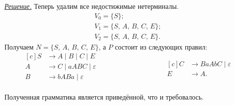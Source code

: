 \documentclass[10pt]{article}
\newcounter{pr} \setcounter{pr}{0}
\newenvironment{sol}
  {\par
   {\itshape \underline{Решение.}}}
  {}
\newcommand{\eps}{\varepsilon}
\begin{document}
\begin{pr}
\begin{sol}
      Теперь удалим все недостижимые нетерминалы.
      \begin{gather*}
        V_0 = \{ S \}; \\
        V_1 = \{ S,\, A,\, B,\, C,\, E \}; \\
        V_2 = \{ S,\, A,\, B,\, C,\, E \}.
      \end{gather*}
      Получаем $N = \{ S,\, A,\, B,\, C,\, E \}$, а $P$ состоит из следующих правил:
      \begin{equation*}
        \begin{aligned}[c]
          S & \to A \mid B \mid C \mid E \\
          A & \to C  \mid aABC \mid \eps \\
          B & \to bABa \mid \eps \\
        \end{aligned}
        \hspace{4cm}
        \begin{aligned}[c]
          C & \to BaAbC \mid \eps \\
          E & \to A.
        \end{aligned}
      \end{equation*}

      Полученная грамматика является приведённой, что и требовалось.
    \end{sol}
  \end{pr}
\end{document}
